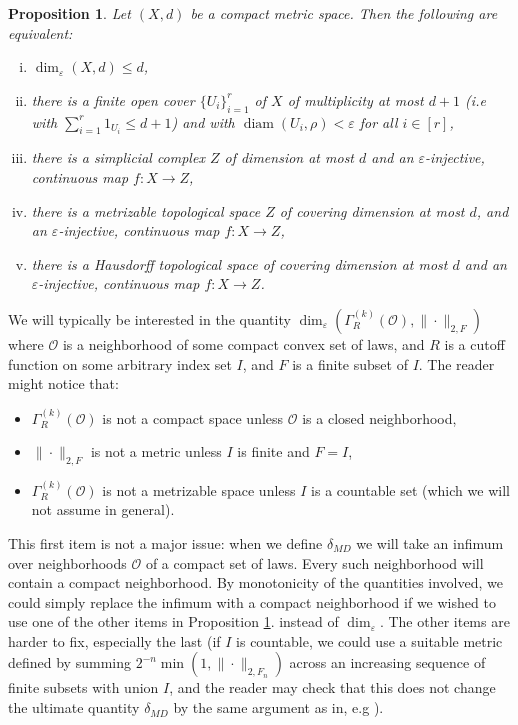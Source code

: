 \documentclass[10pt]{amsart}
\newtheorem{prop}[thm]{Proposition}
\theoremstyle{definition}
\numberwithin{equation}{section}
\DeclareMathOperator{\diam}{diam}
\begin{document}
\begin{prop}\label{prop: dim TFAE}
Let  $(X,d)$ be a compact metric space. Then the following are equivalent:
\begin{enumerate}[(i)]
    \item $\dim_{\varepsilon}(X,d)\leq d$,
    \item there is a finite open cover $\{U_{i}\}_{i=1}^{r}$ of $X$ of multiplicity at most $d+1$ (i.e with $\sum_{i=1}^{r}1_{U_{i}}\leq d+1$) and with $\diam(U_{i},\rho)<\varepsilon$ for all $i\in [r]$, 
    \item there is a simplicial complex $Z$ of dimension at most $d$ and an $\varepsilon$-injective, continuous map $f\colon X\to Z$,
    \item there is a metrizable topological space $Z$ of covering dimension at most $d$, and an $\varepsilon$-injective, continuous map $f\colon X\to Z$,
    \item there is a Hausdorff topological space of covering dimension at most $d$ and an $\varepsilon$-injective, continuous map $f\colon X\to Z$. 
\end{enumerate}
\end{prop}

 We will typically be interested in the quantity $\dim_{\varepsilon}(\Gamma^{(k)}_{R}(\mathcal{O}),\|\cdot\|_{2,F})$ where $\mathcal{O}$ is a neighborhood of some compact convex set of laws, and $R$ is a cutoff function on some arbitrary index set $I$, and $F$ is a finite subset of $I$. The reader might notice that:
\begin{itemize}
    \item $\Gamma^{(k)}_{R}(\mathcal{O})$ is not a compact space unless $\mathcal{O}$ is a closed neighborhood,
    \item $\|\cdot\|_{2,F}$ is not a metric unless $I$ is finite and $F=I$,
    \item $\Gamma^{(k)}_{R}(\mathcal{O})$ is not a metrizable space unless $I$ is a countable set (which we will not assume in general).
\end{itemize}
This first item is not a major issue: when we define $\delta_{MD}$ we will take an infimum over neighborhoods $\mathcal{O}$ of a compact set of laws. Every such neighborhood will contain a compact neighborhood. By monotonicity of the quantities involved, we could simply replace the infimum with a compact neighborhood if we wished to use one of the other items in Proposition \ref{prop: dim TFAE}. instead of $\dim_{\varepsilon}$. The other items are harder to fix, especially the last (if $I$ is countable, we could use a suitable metric defined by summing $2^{-n}\min(1,\|\cdot\|_{2,F_{n}})$ across an increasing sequence of finite subsets with union $I$, and the reader may check that this does not change the ultimate quantity $\delta_{MD}$ by the same argument as in, e.g \cite[Lemma 4.4]{Li}). 
\end{document}
